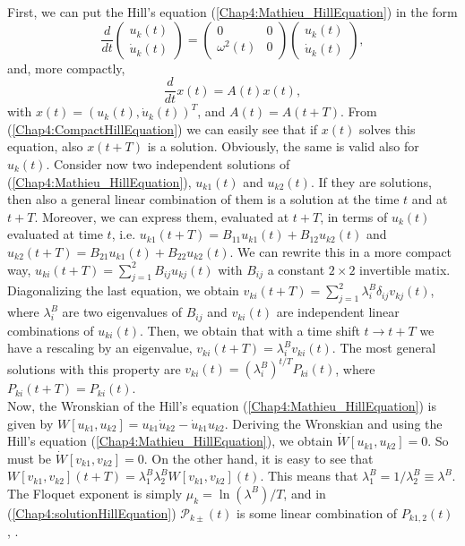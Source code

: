 \documentclass[11pt,a4paper,twoside]{book}
\begin{document}
First, we can put the Hill's equation (\ref{Chap4:Mathieu_HillEquation}) in the form
\begin{equation}
	\frac{d}{dt}
\left(
\begin{array}{c}
	u_{k}(t) \\
	\dot{u}_{k}(t)	
\end{array}
\right)
=
\left(
\begin{array}{cc}
	0  & 0 \\
	\omega^{2}(t) & 0
\end{array}
\right)
\left(
\begin{array}{c}
	u_{k}(t) \\
	\dot{u}_{k}(t)	
\end{array}
\right),
\end{equation}
and, more compactly,
\begin{equation}
	\label{Chap4:CompactHillEquation}
	\frac{d}{dt} x(t) = A(t) x(t),
\end{equation}
with $ x(t)=(u_{k}(t),\dot{u}_{k}(t))^{T} $, and $ A(t)=A(t+T) $. From (\ref{Chap4:CompactHillEquation}) we can easily see that if $ x(t) $ solves this equation, also $ x(t+T) $ is a solution. Obviously, the same is valid also for $ u_{k}(t) $. Consider now two independent solutions of (\ref{Chap4:Mathieu_HillEquation}), $ u_{k1}(t) $ and $ u_{k2}(t) $. If they are solutions, then also a general linear combination of them is a solution at the time $ t $ and at $ t+T $. Moreover, we can express them, evaluated at $ t+T $, in terms of $ u_{k}(t) $ evaluated at time $ t $, i.e. $ u_{k1}(t+T)=B_{11}u_{k1}(t) + B_{12}u_{k2}(t) $ and $ u_{k2}(t+T)=B_{21}u_{k1}(t) + B_{22}u_{k2}(t) $. We can rewrite this in a more compact way, $ u_{ki}(t+T)= \sum_{j=1}^{2}B_{ij}u_{kj}(t) $ with $ B_{ij} $ a constant $ 2\times 2 $ invertible matix. Diagonalizing the last equation, we obtain $ v_{ki}(t+T)=\sum_{j=1}^{2}\lambda_{i}^{B}\delta_{ij}v_{kj}(t) $, where $ \lambda_{i}^{B} $ are two eigenvalues of $ B_{ij} $ and $ v_{ki}(t) $ are independent linear combinations of $ u_{ki}(t) $. Then, we obtain that with a time shift $ t \rightarrow t+T $ we have a rescaling by an eigenvalue, $ v_{ki}(t+T)=\lambda_{i}^{B}v_{ki}(t) $. 
The most general solutions with this property are $ v_{ki}(t)=(\lambda_{i}^{B})^{t/T}P_{ki}(t) $, where $ P_{ki}(t+T)=P_{ki}(t) $. \\ Now, the Wronskian of the Hill's equation (\ref{Chap4:Mathieu_HillEquation}) is given by $ W[u_{k1},u_{k2}]=u_{k1}\dot{u}_{k2}-\dot{u}_{k1}u_{k2} $. Deriving the Wronskian and using the Hill's equation (\ref{Chap4:Mathieu_HillEquation}), we obtain $ \dot{W}[u_{k1},u_{k2}]=0 $. So must be $ \dot{W}[v_{k1},v_{k2}]=0$. On the other hand, it is easy to see that $ W[v_{k1},v_{k2}](t+T) = \lambda_{1}^{B}\lambda_{2}^{B}W[v_{k1},v_{k2}](t) $. This means that $ \lambda_{1}^{B}=1/\lambda^{B}_{2} \equiv \lambda^{B} $. The Floquet exponent is simply $ \mu_{k} = \ln(\lambda^{B})/T $, and in (\ref{Chap4:solutionHillEquation}) $\mathcal{P}_{k\pm}(t)$ is some linear combination of $ P_{k1,2}(t) $ \cite{Chap4:AminHetrzberg}, \cite{Chap4:Lozanov}.\
\end{document}
